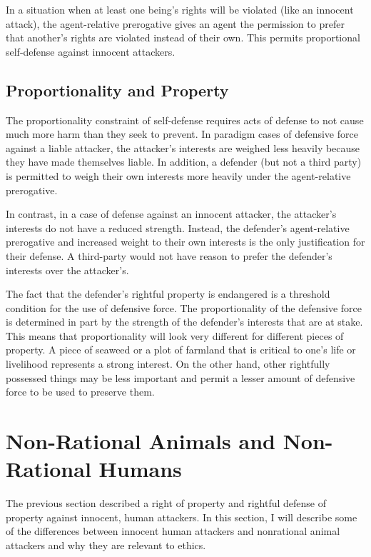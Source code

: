 \documentclass[12pt]{book}
\begin{document}
	In a situation when at least one being’s rights will be violated (like an
	innocent attack), the agent-relative prerogative gives an agent the
	permission to prefer that another’s rights are violated instead of their
	own. This permits proportional self-defense against innocent attackers.
	
	\subsection{Proportionality and Property}

	The proportionality constraint of self-defense requires acts of defense
	to not cause much more harm than they seek to prevent. In paradigm cases
	of defensive force against a liable attacker, the attacker’s interests
	are weighed less heavily because they have made themselves liable. In
	addition, a defender (but not a third party) is permitted to weigh their
	own interests more heavily under the agent-relative prerogative.

	In contrast, in a case of defense against an innocent attacker, the
	attacker’s interests do not have a reduced strength. Instead, the defender’s
	agent-relative prerogative and increased weight to their own interests is
	the only justification for their defense. A third-party would not have
	reason to prefer the defender’s interests over the attacker’s.

	The fact that the defender’s rightful property is endangered is a threshold
	condition for the use of defensive force. The proportionality of the
	defensive force is determined in part by the strength of the defender’s
	interests that are at stake. This means that proportionality will look very
	different for different pieces of property. A piece of seaweed or a plot of
	farmland that is critical to one’s life or livelihood represents a strong
	interest. On the other hand, other rightfully possessed things may be less
	important and permit a lesser amount of defensive force to be used to
	preserve them.

\section{Non-Rational Animals and Non-Rational Humans}
 
	The previous section described a right of property and rightful defense
	of property against innocent, human attackers. In this section, I will
	describe some of the differences between innocent human attackers and
	nonrational animal attackers and why they are relevant to ethics.
    
\end{document}
